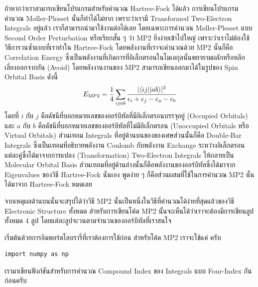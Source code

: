 ถ้าหากว่าเราสามารถเขียนโปรแกรมสำหรับคำนวณ Hartree-Fock ได้แล้ว การเขียนโปรแกรมคำนวณ M\o{}ller-Plesset นั้นก็ทำได้ไม่ยาก เพราะว่าเรามี Transformed Two-Electron Integrals อยู่แล้ว เราก็สามารถนำมาใช้งานต่อได้เลย โดยเฉพาะการคำนวณ M\o{}ller-Plesset แบบ Second Order Perturbation หรือเรียกสั้น ๆ ว่า MP2 ยิ่งง่ายเข้าไปใหญ่ เพราะว่าเราไม่ต้องใช้วิธีการวนซ้ำแบบที่เราทำใน Hartree-Fock โดยพลังงานที่เราจะคำนวณด้วย MP2 นั้นก็คือ Correlation Energy ซึ่งเป็นพลังงานที่เกิดการที่อิเล็กตรอนในโมเลกุลนั้นพยายามผลักหรือหลีกเลี่ยงออกจากกัน (Avoid) โดยพลังงานงานของ MP2 สามารถเขียนออกมาได้ในรูปของ Spin Orbital Basis ดังนี้
%
\begin{equation}
  E_{\rm MP2}
  =
  \frac{1}{4}
  \sum_{ijab}
  \frac{
    \vert \langle ij \vert \vert ab \rangle\vert ^2
  }{
    \epsilon_i+\epsilon_j-\epsilon_a-\epsilon_b
  }
\end{equation}
%
โดยที่ $i$ กับ $j$ คือดัชนีที่บอกหมายเลขของออร์บิทัลที่มีอิเล็กตรอนบรรจุอยู่ (Occupied Orbitals) และ $a$ กับ $b$ คือดัชนีที่บอกหมายเลขของออร์บิทัลที่ไม่มีอิเล็กตรอน (Unoccupied Orbitals หรือ Virtual Orbitals) ส่วนเทอม Integrals ที่อยู่ด้านบนของของเศษส่วนนั้นก็คือ Double-Bar Integrals ซึ่งเป็นเทอมที่อธิบายพลังงาน Coulomb กับพลังงาน Exchange ระหว่างอิเล็กตรอนแต่ละคู่ซึ่งได้มาจากการแปลง (Transformation) Two-Electron Integrals ให้กลายเป็น Molecular Orbital Basis ส่วนเทอมที่อยู่ด้านล่างนั้นก็คือพลังงานของออร์บิทัลซึ่งได้มาจาก Eigenvalues ของวิธี Hartree-Fock นั่นเอง พูดง่าย ๆ ก็คือส่วนผสมที่ใช้ในการคำนวณ MP2 นั้นได้มาจาก Hartree-Fock หมดเลย

จากเหตุผลด้านบนนั้นจะสรุปได้ว่าวิธี MP2 นั้นเป็นหนึ่งในวิธีที่คำนวณได้ง่ายที่สุดแล้วของวิธี Electronic Structure ทั้งหมด สำหรับการเขียนโค้ด MP2 นั้นจะเห็นได้ว่าเราจะต้องมีการเขียนลูปทั้งหมด 4 ลูป โดยแต่ละลูปจะวนตามจำนวนของออร์บิทัลที่เราสนใจ

\vspace{5pt}

\noindent เริ่มต้นด้วยการอิมพอร์ตไลบรารี่ที่เราต้องการใช้ก่อน สำหรับโค้ด MP2 เราจะใช้แค่  ครับ

\vspace{5pt}

\begin{lstlisting}[style=MyPython]
import numpy as np
\end{lstlisting}

\vspace{5pt}

\noindent เรามาเขียนฟังก์ชันสำหรับการคำนวณ Compound Index ของ Integrals แบบ Four-Index กันก่อนครับ


